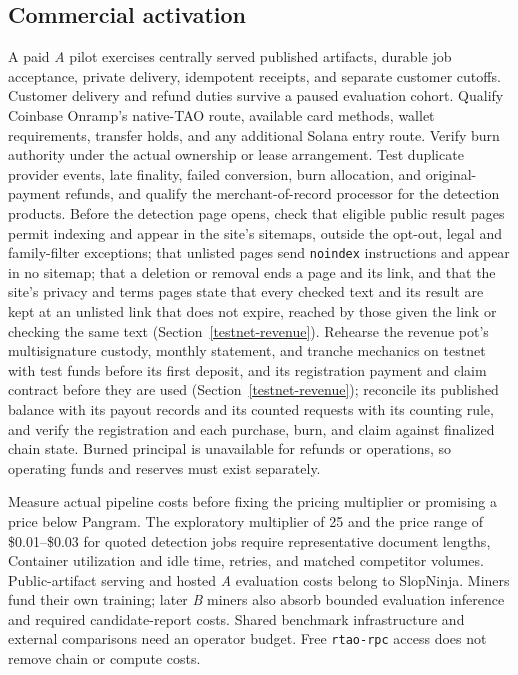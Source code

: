 \subsection{Commercial activation}

A paid \textit{A} pilot exercises centrally served published artifacts, durable job
acceptance, private delivery, idempotent receipts, and separate customer
cutoffs. Customer delivery and refund duties survive a paused evaluation
cohort. Qualify Coinbase Onramp's native-TAO route, available card methods,
wallet requirements, transfer holds, and any additional Solana entry route.
Verify burn authority under the actual ownership or lease arrangement.
Test duplicate provider events, late finality, failed conversion, burn
allocation, and original-payment refunds, and qualify the merchant-of-record
processor for the detection products. Before the detection page opens, check
that eligible public result pages permit indexing and appear in the site's
sitemaps, outside the opt-out, legal and family-filter exceptions; that
unlisted pages send \texttt{noindex} instructions and appear in no sitemap;
that a
deletion or removal ends a page and its link, and that the site's
privacy and terms pages state that every checked text and its result are kept
at an unlisted link that does not expire, reached by those given the link or
checking the same text (Section~\ref{testnet-revenue}). Rehearse the revenue pot's multisignature custody,
monthly statement, and tranche mechanics on testnet with test funds before its
first deposit, and its registration payment and claim contract before they are
used (Section~\ref{testnet-revenue}); reconcile its published balance with its
payout records and its counted requests with its counting rule, and verify
the registration and each purchase, burn, and claim against finalized chain
state. Burned principal is unavailable for
refunds or operations, so operating funds and reserves must exist separately.

Measure actual pipeline costs before fixing the pricing multiplier or promising
a price below Pangram. The exploratory multiplier of 25 and the price range of
\$0.01--\$0.03 for quoted detection jobs require representative document lengths,
Container utilization and idle time, retries, and matched competitor volumes. Public-artifact
serving and hosted \textit{A} evaluation costs belong to SlopNinja. Miners fund
their own training; later \textit{B} miners also absorb bounded evaluation
inference and required candidate-report costs. Shared benchmark infrastructure
and external comparisons need an operator budget. Free \texttt{rtao-rpc} access
does not remove chain or compute costs.

